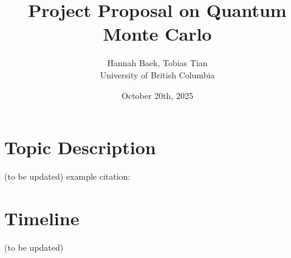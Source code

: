 \documentclass[11pt]{article}
\begin{document}
\title{Project Proposal on Quantum Monte Carlo}

\author{Hannah Baek, Tobias Tian \\
University of British Columbia}

\date{\vspace{-2.5ex} October 20th, 2025}
\maketitle


\section{Topic Description}
(to be updated)
example citation: \cite{shor_97}

\section{Timeline}
(to be updated)





\end{document}

